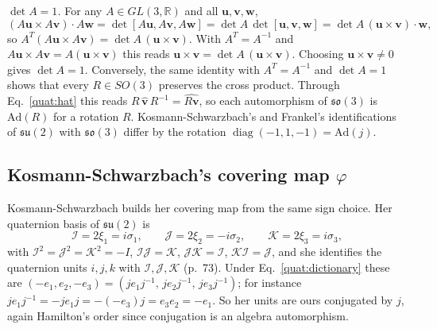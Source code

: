 \emph{$\det A=1$.} For any $A\in GL(3,\mathbb R)$ and all
$\mathbf u,\mathbf v,\mathbf w$,
\begin{equation}
 (A\mathbf u\times A\mathbf v)\cdot A\mathbf w
 =\det[A\mathbf u,A\mathbf v,A\mathbf w]
 =\det A\,\det[\mathbf u,\mathbf v,\mathbf w]
 =\det A\,(\mathbf u\times\mathbf v)\cdot\mathbf w ,
\end{equation}
so $A^T(A\mathbf u\times A\mathbf v)=\det A\,(\mathbf u\times\mathbf v)$.
With $A^T=A^{-1}$ and $A\mathbf u\times A\mathbf v=A(\mathbf u\times\mathbf v)$
this reads $\mathbf u\times\mathbf v=\det A\,(\mathbf u\times\mathbf v)$.
Choosing $\mathbf u\times\mathbf v\neq0$ gives $\det A=1$. Conversely, the
same identity with $A^T=A^{-1}$ and $\det A=1$ shows that every
$R\in SO(3)$ preserves the cross product. Through Eq.~\eqref{quat:hat} this
reads $R\,\widehat{\mathbf v}\,R^{-1}=\widehat{R\mathbf v}$, so each
automorphism of $\mathfrak{so}(3)$ is $\mathrm{Ad}(R)$ for a rotation $R$.
Kosmann-Schwarzbach's and Frankel's identifications of $\mathfrak{su}(2)$
with $\mathfrak{so}(3)$ differ by the rotation
$\operatorname{diag}(-1,1,-1)=\mathrm{Ad}(j)$.

\subsection{Kosmann-Schwarzbach's covering map \texorpdfstring{$\varphi$}{phi}}\label{quat:sec:KS-phi}
Kosmann-Schwarzbach builds her covering map from the same sign choice. Her
quaternion basis of $\mathfrak{su}(2)$ is
\cite[Ch.~5 \S1.1(d), p.~72]{dgdt:YKosmann-Schwarzbach2010}
\begin{equation}\label{quat:KS-IJK}
 \mathcal I=2\xi_1=i\sigma_1,\qquad
 \mathcal J=2\xi_2=-i\sigma_2,\qquad
 \mathcal K=2\xi_3=i\sigma_3,
\end{equation}
with $\mathcal I^2=\mathcal J^2=\mathcal K^2=-I$, $\mathcal I\mathcal J=\mathcal K$,
$\mathcal J\mathcal K=\mathcal I$, $\mathcal K\mathcal I=\mathcal J$, and she
identifies the quaternion units $i,j,k$ with $\mathcal I,\mathcal J,\mathcal K$
(p.~73). Under Eq.~\eqref{quat:dictionary} these are
$(-e_1,e_2,-e_3)=(je_1j^{-1},\,je_2j^{-1},\,je_3j^{-1})$; for instance
$je_1j^{-1}=-je_1j=-(-e_3)j=e_3e_2=-e_1$. So her units are ours conjugated
by $j$, again Hamilton's order since conjugation is an algebra
automorphism.

